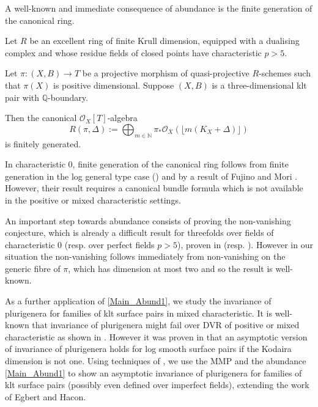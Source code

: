 \documentclass[a4paper,12pt]{book}
\newcommand{\ox}{\mathcal{O}_{X}}
\begin{document}
	A well-known and immediate consequence of abundance is the finite generation of the canonical ring.
	
	\begin{theorem}
		Let $R$ be an excellent ring of finite Krull dimension, equipped with a dualising complex and whose residue fields of closed points have characteristic $p>5$.
		
		Let $\pi \colon (X,B) \to T$ be a projective morphism of quasi-projective $R$-schemes such that $\pi(X)$ is positive dimensional.
		Suppose $(X,B)$ is a three-dimensional klt pair with $\mathbb{Q}$-boundary. 
		
		Then the canonical $\ox[T]$-algebra
		\[R(\pi,\Delta):=\bigoplus_{m \in \mathbb{N}} \pi_{*}\ox(\lfloor m(K_{X}+\Delta)\rfloor)\]
		is finitely generated.
	\end{theorem}

	In characteristic $0$, finite generation of the canonical ring follows from finite generation in the log general type case (\cite{BCHM10}) and by a result of Fujino and Mori \cite[Theorem 5.2]{FM00}. However, their result requires a canonical bundle formula which is not available in the positive or mixed characteristic settings.

\begin{remark}
	An important step towards abundance consists of proving the non-vanishing conjecture, which is already a difficult result for threefolds over fields of characteristic $0$ (resp. over perfect fields $p>5$), proven in  \cite{FA} (resp. \cite{XZ19}).
	However in our situation the non-vanishing follows immediately from non-vanishing on the generic fibre of $\pi$, which has dimension at most two and so the result is well-known.
\end{remark}
	As a further application of \autoref{Main_Abund1}, we study the invariance of plurigenera for families of klt surface pairs in mixed characteristic.
	It is well-known that invariance of plurigenera might fail over DVR of positive or mixed characteristic as shown in \cite{KU, Suh08, Bri20}.
	However it was proven in \cite{EH} that an asymptotic version of invariance of plurigenera holds for log smooth surface pairs if the Kodaira dimension is not one.
	Using techniques of \cite{HMX18}, we use the MMP and the abundance \autoref{Main_Abund1} to show an asymptotic invariance of plurigenera for families of klt surface pairs (possibly even defined over imperfect fields), extending the work of Egbert and Hacon.
\end{document}

